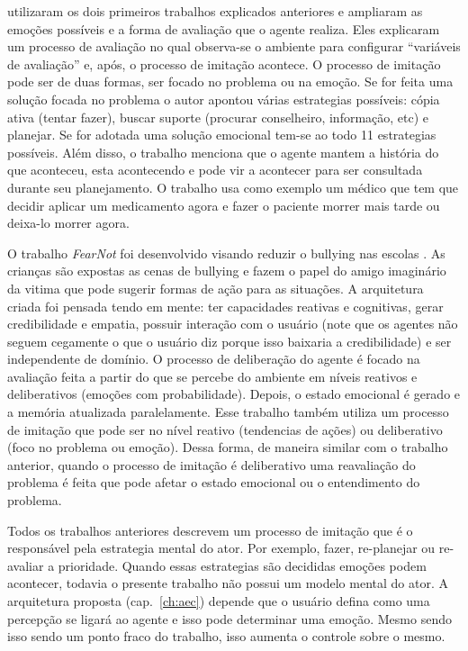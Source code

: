 \citet{gratch2004domain} utilizaram os dois primeiros trabalhos explicados
anteriores e ampliaram as emoções possíveis e a forma de avaliação que o
agente realiza. Eles explicaram um processo de avaliação no qual observa-se
o ambiente para configurar ``variáveis de avaliação'' e, após, o
processo de imitação acontece. O processo de imitação pode ser de duas formas,
ser focado no problema ou na emoção. Se for feita uma solução focada no
problema o autor apontou várias estrategias possíveis: cópia ativa (tentar
fazer), buscar suporte (procurar conselheiro, informação, etc) e planejar. Se
for adotada uma solução emocional tem-se ao todo 11 estrategias possíveis.
Além disso, o trabalho menciona que o agente
mantem a história do que aconteceu, esta acontecendo e pode vir a
acontecer para ser consultada durante seu planejamento. O trabalho usa como
exemplo um médico que tem que decidir aplicar um medicamento agora e fazer o
paciente morrer mais tarde ou deixa-lo morrer agora.

O trabalho \emph{FearNot} foi desenvolvido visando reduzir o bullying nas
escolas \cite{dias2005feeling}. As crianças são expostas as cenas de bullying
e fazem o papel do amigo imaginário da vitima que pode sugerir formas de ação
para as situações. A arquitetura criada foi pensada tendo em
mente: ter capacidades reativas e cognitivas, gerar credibilidade e empatia,
possuir interação com o usuário (note que os agentes não seguem cegamente o que
o usuário diz porque isso baixaria a credibilidade) e ser independente de
domínio.
%
O processo de deliberação do agente é focado na avaliação feita a partir do
que se percebe do ambiente em níveis reativos e deliberativos (emoções com
probabilidade). Depois, o estado emocional é gerado e a memória atualizada
paralelamente. Esse trabalho também utiliza um processo de imitação que pode
ser no nível reativo (tendencias de ações) ou deliberativo (foco no problema
ou emoção). Dessa forma, de maneira similar com o trabalho anterior, quando o
processo de imitação é deliberativo uma reavaliação do problema é feita que
pode afetar o estado emocional ou o entendimento do problema.

Todos os trabalhos anteriores descrevem um processo de imitação que é o
responsável pela estrategia mental do ator. Por exemplo, fazer, re-planejar ou
re-avaliar a prioridade. Quando essas estrategias são decididas emoções podem
acontecer, todavia o presente trabalho não possui um modelo mental do ator. A
arquitetura proposta (cap.~\ref{ch:aec}) depende que o usuário defina como uma percepção se ligará
ao agente e isso pode determinar uma emoção. Mesmo sendo isso sendo um ponto
fraco do trabalho, isso aumenta o controle sobre o mesmo.

